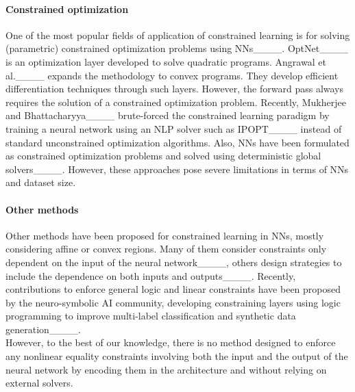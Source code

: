 \paragraph{Constrained optimization}
One of the most popular fields of application of constrained learning is for solving (parametric) constrained optimization problems using NNs____. OptNet____ is an optimization layer developed to solve quadratic programs. Angrawal et al.____ expands the methodology to convex programs. They develop efficient differentiation techniques through such layers. However, the forward pass always requires the solution of a constrained optimization problem. Recently, Mukherjee and Bhattacharyya____ brute-forced the constrained learning paradigm by training a neural network using an NLP solver such as IPOPT____ instead of standard unconstrained optimization algorithms. Also, NNs have been formulated as constrained optimization problems and solved using deterministic global solvers____. However, these approaches pose severe limitations in terms of NNs and dataset size.


\paragraph{Other methods}
Other methods have been proposed for constrained learning in NNs, mostly considering affine or convex regions. Many of them consider constraints only dependent on the input of the neural network____, others design strategies to include the dependence on both inputs and outputs____. Recently, contributions to enforce general logic and linear constraints have been proposed by the neuro-symbolic AI community, developing constraining layers using logic programming to improve multi-label classification and synthetic data generation____.\\
However, to the best of our knowledge, there is no method designed to enforce any nonlinear equality constraints involving both the input and the output of the neural network by encoding them in the architecture and without relying on external solvers.
